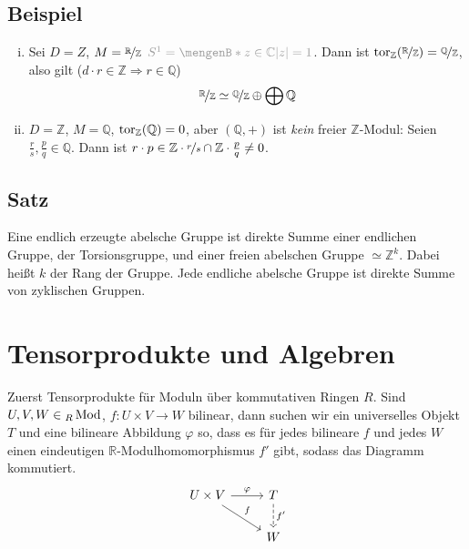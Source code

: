 \subsection[Beispiele für Zerlegungen mit dem Torsionsmodul]{Beispiel} %
\label{sub:252}
\begin{enumerate}[(i)]
	\item Sei $D=Z$, $M= \nicefrac{\mathds{R}}{\mathds{Z}} \enspace {\color{light_gray} S^1 = \set[z \in \mathds{C}]{\abs*{z}=1}}$. Dann ist 
	\(
		\tor_\mathds{Z}(\nicefrac{\mathds{R}}{\mathds{Z}}) = \nicefrac{\mathds{Q}}{\mathds{Z}}
	\), also gilt ($d \cdot r \in \mathds{Z} \Rightarrow r \in \mathds{Q}$)
	\[
		\nicefrac{\mathds{R}}{\mathds{Z}} \simeq \nicefrac{\mathds{Q}}{\mathds{Z}} \oplus \bigoplus \mathds{Q}
	\]
	\item $D=\mathds{Z}$, $M=\mathds{Q}$, $\tor_\mathds{Z}(\mathds{Q})= 0$, aber $(\mathds{Q},+)$ ist \emph{kein} freier $\mathds{Z}$-Modul: Seien 
	$\frac{r}{s}, \frac{p}{q} \in \mathds{Q}$. Dann ist $r \cdot p \in \mathds{Z} \cdot \nicefrac{r}{s} \cap \mathds{Z} \cdot \frac{p}{q} \not= 0 $.
\end{enumerate}

\subsection[Satz: Umformulierung des Struktursatzes für endl. erzeugte abelsche Gruppen]{Satz} %
\label{sub:253}
Eine endlich erzeugte abelsche Gruppe ist direkte Summe einer endlichen Gruppe, der Torsionsgruppe, und einer freien abelschen Gruppe $\simeq \mathds{Z}^k$. Dabei heißt
$k$ der Rang der Gruppe. Jede endliche abelsche Gruppe ist direkte Summe von zyklischen Gruppen.
\newpage

\section{Tensorprodukte und Algebren} %
\label{sec:3}
Zuerst Tensorprodukte für Moduln über kommutativen Ringen $R$. Sind $U,V, W \in {_R \Mod}$, $f : U \times V \to W$ bilinear, dann suchen wir ein universelles Objekt $T$
und eine bilineare Abbildung $\varphi$ so, dass es für jedes bilineare $f$ und jedes $W$ einen eindeutigen $\mathds{R}$-Modulhomomorphismus $f'$ gibt, sodass das 
Diagramm kommutiert.
\[
	\begin{tikzcd}
		U \times V \rar{\varphi} \drar{f} & T \dar[dashed]{f'}\\
		& W
	\end{tikzcd}
\]
